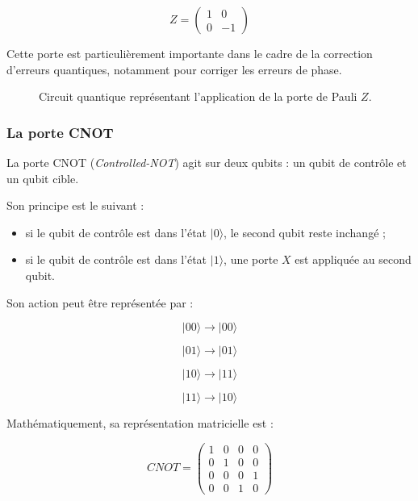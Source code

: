 \documentclass[a4paper,12pt]{article}
\begin{document}
\[
Z
=
\begin{pmatrix}
1 & 0\\
0 & -1
\end{pmatrix}
\]

Cette porte est particulièrement importante dans le cadre de la correction d’erreurs quantiques, notamment pour corriger les erreurs de phase.

\begin{figure}[H]
\centering
{}
\caption{Circuit quantique représentant l’application de la porte de Pauli $Z$.}
\end{figure}

\subsubsection{La porte CNOT}

La porte CNOT (\textit{Controlled-NOT}) agit sur deux qubits : un qubit de contrôle et un qubit cible.

Son principe est le suivant :

\begin{itemize}
    \item si le qubit de contrôle est dans l’état $|0\rangle$, le second qubit reste inchangé ;
    \item si le qubit de contrôle est dans l’état $|1\rangle$, une porte $X$ est appliquée au second qubit.
\end{itemize}

Son action peut être représentée par :

\[
|00\rangle \rightarrow |00\rangle
\]

\[
|01\rangle \rightarrow |01\rangle
\]

\[
|10\rangle \rightarrow |11\rangle
\]

\[
|11\rangle \rightarrow |10\rangle
\]

Mathématiquement, sa représentation matricielle est :

\[
CNOT=
\begin{pmatrix}
1&0&0&0\\
0&1&0&0\\
0&0&0&1\\
0&0&1&0
\end{pmatrix}
\]
\end{document}
